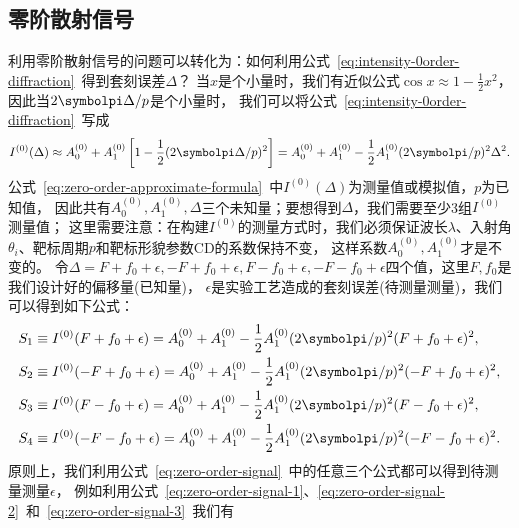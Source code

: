 \subsection{零阶散射信号~\label{零阶散射信号}}

利用零阶散射信号的问题可以转化为：如何利用公式~\eqref{eq:intensity-0order-diffraction}~得到套刻误差$\Delta$？
当$x$是个小量时，我们有近似公式$\cos x\approx1-\frac{1}{2}x^2$，因此当$2\symbolpi\Delta/p$是个小量时，
我们可以将公式~\eqref{eq:intensity-0order-diffraction}~写成
\begin{equation}\label{eq:zero-order-approximate-formula}
I^{(0)}(\Delta) \approx A_0^{(0)} + A_1^{(0)}\left[1 - \frac{1}{2}(2\symbolpi\Delta/p)^2\right]
= A_0^{(0)} + A_1^{(0)} - \frac{1}{2}A_1^{(0)} (2\symbolpi/p)^2 \Delta^2.
\end{equation}
公式~\eqref{eq:zero-order-approximate-formula}~中$I^{(0)}(\Delta)$为测量值或模拟值，$p$为已知值，
因此共有$A_0^{(0)},A_1^{(0)},\Delta$三个未知量；要想得到$\Delta$，我们需要至少3组$I^{(0)}$测量值；
这里需要注意：在构建$I^{(0)}$的测量方式时，我们必须保证波长$\lambda$、入射角$\theta_i$、靶标周期$p$和靶标形貌参数CD的系数保持不变，
这样系数$A_0^{(0)},A_1^{(0)}$才是不变的。
令$\Delta=F+f_0+\epsilon,-F+f_0+\epsilon,F-f_0+\epsilon,-F-f_0+\epsilon$四个值，这里$F,f_0$是我们设计好的偏移量(已知量)，
$\epsilon$是实验工艺造成的套刻误差(待测量测量)，我们可以得到如下公式：
\begin{subequations}\label{eq:zero-order-signal}
\begin{align}
S_1 &\equiv I^{(0)}(F+f_0+\epsilon) = A_0^{(0)} + A_1^{(0)} - \frac{1}{2}A_1^{(0)}(2\symbolpi/p)^2 (F+f_0+\epsilon)^2, \label{eq:zero-order-signal-1} \\
S_2 &\equiv I^{(0)}(-F+f_0+\epsilon) = A_0^{(0)} + A_1^{(0)} - \frac{1}{2}A_1^{(0)}(2\symbolpi/p)^2 (-F+f_0+\epsilon)^2, \label{eq:zero-order-signal-2} \\
S_3 &\equiv I^{(0)}(F-f_0+\epsilon) = A_0^{(0)} + A_1^{(0)} - \frac{1}{2}A_1^{(0)}(2\symbolpi/p)^2 (F-f_0+\epsilon)^2, \label{eq:zero-order-signal-3} \\
S_4 &\equiv I^{(0)}(-F-f_0+\epsilon) = A_0^{(0)} + A_1^{(0)} - \frac{1}{2}A_1^{(0)}(2\symbolpi/p)^2 (-F-f_0+\epsilon)^2. \label{eq:zero-order-signal-4} 
\end{align}
\end{subequations}
原则上，我们利用公式~\eqref{eq:zero-order-signal}~中的任意三个公式都可以得到待测量测量$\epsilon$，
例如利用公式~\eqref{eq:zero-order-signal-1}、\eqref{eq:zero-order-signal-2}~和~\eqref{eq:zero-order-signal-3}~我们有
